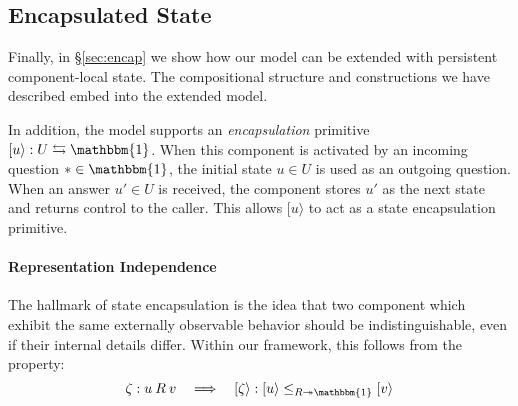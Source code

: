 \documentclass[acmsmall,screen,review,anonymous]{acmart}
\newcommand{\lensarrow}{\leftrightarrows}
\begin{document}
\subsection{Encapsulated State} \label{sec:overview:encap} %

Finally,
in \S\ref{sec:encap}
we show how our model can be extended
with persistent component-local state.
%
%
%
The compositional structure and constructions we have described
embed into the extended model.

In addition,
the model supports an \emph{encapsulation} primitive
$
  [ u \rangle : U \lensarrow \mathbbm{1}
$.
When this component is activated
by an incoming question $* \in \mathbbm{1}$,
the initial state $u \in U$ is used
as an outgoing question.
When an answer $u' \in U$ is received,
the component stores $u'$ as the next state
and returns control to the caller.
This allows $[ u \rangle$ to act
as a state encapsulation primitive.


\paragraph{Representation Independence} %

The hallmark of state encapsulation is
the idea that two component which exhibit
the same externally observable behavior
should be indistinguishable,
even if their internal details differ.
Within our framework,
this follows from the property:
\[
  \zeta : u \mathbin{R} v
  \quad\Longrightarrow\quad
  [\zeta\rangle : [u\rangle \le_{R \twoheadrightarrow \mathbbm{1}} [v\rangle
\]

\end{document}
